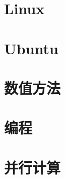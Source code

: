 \documentclass[cn,11pt,chinese,twoside]{elegantbook}
\begin{document}
\part{Linux}







\part{Ubuntu}


\part{数值方法}


\part{编程}



\part{并行计算}

\end{document}

